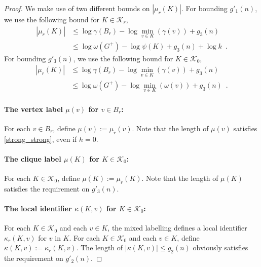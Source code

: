 \documentclass{patmorin}
\renewcommand{\le}{\leqslant}
\newcommand{\pat}[1]{\textcolor{Magenta}{PaMo: #1}}
\let\eqref\cref
\newcommand{\calK}{\mathcal{K}}
\begin{document}
\begin{proof}
    We make use of two different bounds on $|\mu_r(K)|$.  For bounding $g'_1(n)$, 
    we use the following bound for $K\in\calK_r$,
    \begin{align*}
       |\mu_r(K)|
       & \le\log \gamma(B_r) - \log \min_{v\in K}(\gamma(v)) + g_3(n) \\
       & \le \log \omega(G^+) - \log\psi(K) + g_3(n) + \log k \enspace .
    \end{align*}
    For bounding $g'_3(n)$, we use the following bound for $K\in\calK_0$,
    \begin{align*}
       |\mu_r(K)|
       & \le\log \gamma(B_r) - \log\min_{v\in K}(\gamma(v)) + g_3(n) \\
       & \le \log \omega(G^+) - \log\min_{v\in K}(\omega(v)) + g_3(n)  \enspace .
    \end{align*}

    \paragraph{\boldmath The vertex label $\mu(v)$ for $v\in B_r$:}
    For each $v\in B_r$, define $\mu(v) := \mu_r(v)$.
    Note that the length of $\mu(v)$ satisfies \eqref{strong_strong}, even if $h=0$.

    \paragraph{\boldmath The clique label $\mu(K)$ for $K\in\calK_0$:}  For each $K\in\calK_0$, define $\mu(K) := \mu_r(K)$.
    Note that the length of $\mu(K)$ satisfies the requirement on $g'_3(n)$.

    \paragraph{\boldmath The local identifier $\kappa(K,v)$ for $K\in\calK_0$:}  For each $K\in\calK_0$ and each $v\in K$, the mixed labelling defines a local identifier $\kappa_r(K,v)$ for $v$ in $K$.
    For each $K\in\calK_0$ and each $v\in K$, define $\kappa(K,v):=\kappa_r(K,v)$.  The length of $|\kappa(K,v)|\le g_2(n)$ obviously satisfies the requirement on $g'_2(n)$.



\end{proof}
\end{document}

